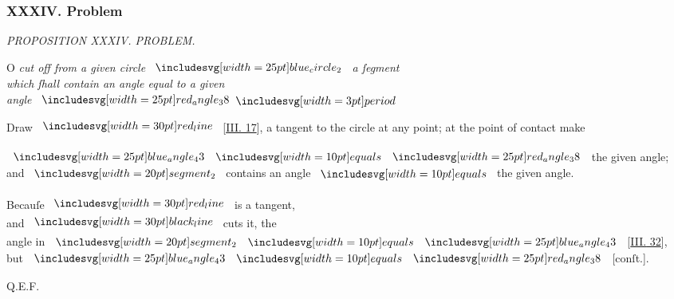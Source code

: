\documentclass[12pt,preview]{standalone}
\begin{document}
\subsubsection{XXXIV. Problem}

\begin{minipage}[t]{0.33\textwidth}
    \vspace{40pt}
    
\end{minipage}%
\hfill
\begin{minipage}[t]{0.64\textwidth}
    \vspace{0pt}

    \begin{center}
        \textit{PROPOSITION XXXIV. PROBLEM.}\label{book3pr34} \\
    \end{center}

    \hfill

    \begin{center}
        \raggedright \lettrine[lines=4, loversize=1, nindent=0pt]{}{}O \textit{cut off from a given circle} $\img{blue_circle_2}$ \textit{a ſegment\\ which ſhall contain an angle equal to a given\\ angle} $\img{red_angle_38} \bperiod$
    \end{center}

    \hfill

    \hfill

    \raggedright Draw $\redline$ [\hyperref[book3pr17]{\textsc{III.} 17}], a tangent to the circle at any point; at the point of contact make

    \hfill

    \begin{center}
        $\img{blue_angle_43} \bequals \img{red_angle_38}$ the given angle;\\
        and $\img[0][0][20]{segment_2}$ contains an angle $\bequals$ the given angle.\\
        \hfill\\
        Becauſe $\redline$ is a tangent,\\
        and $\blackline$ cuts it, the\\
        angle in $\img[0][0][20]{segment_2} \bequals \img{blue_angle_43}$ [\hyperref[book3pr22]{\textsc{III.} 32}],\\
        but $\img{blue_angle_43} \bequals \img{red_angle_38}$ [conſt.].
    \end{center}

    \hfill

    \hfill Q.E.F.
\end{minipage}%
\end{document}
